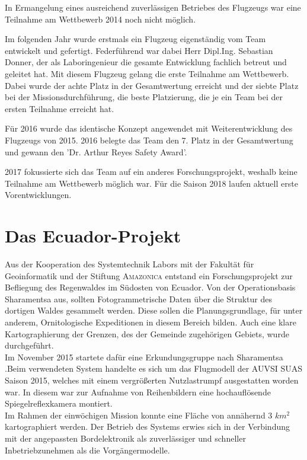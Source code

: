 In Ermangelung eines ausreichend zuverlässigen Betriebes des Flugzeugs war eine Teilnahme am Wettbewerb 2014 noch nicht möglich.

Im folgenden Jahr wurde erstmals ein Flugzeug eigenständig vom Team entwickelt und gefertigt. Federführend war dabei Herr Dipl.Ing. Sebastian Donner, der als Laboringenieur die gesamte Entwicklung fachlich betreut und geleitet hat. Mit diesem Flugzeug gelang die erste Teilnahme am Wettbewerb. Dabei wurde der achte Platz in der Gesamtwertung erreicht und der siebte Platz bei der Missionsdurchführung, die beste Platzierung, die je ein Team bei der ersten Teilnahme erreicht hat.   

Für 2016 wurde das identische Konzept angewendet mit Weiterentwicklung des Flugzeugs von 2015. 2016 belegte das Team den 7. Platz in der Gesamtwertung und gewann den 'Dr. Arthur Reyes Safety Award'.

2017 fokussierte sich das Team auf ein anderes Forschungsprojekt, weshalb keine Teilnahme am Wettbewerb möglich war. Für die Saison 2018 laufen aktuell erste Vorentwicklungen.

\section{Das Ecuador-Projekt}

Aus der Kooperation des Systemtechnik Labors mit der Fakultät für Geoinformatik und der Stiftung \textsc{Amazonica} entstand ein Forschungsprojekt zur Befliegung des Regenwaldes im Südosten von Ecuador. Von der Operationsbasis Sharamentsa aus, sollten Fotogrammetrische Daten über die Struktur des dortigen Waldes gesammelt werden. Diese sollen die Planungsgrundlage, für unter anderem, Ornitologische Expeditionen in diesem Bereich bilden. Auch eine klare Kartographierung der Grenzen, des der Gemeinde zugehörigen Gebiets, wurde durchgeführt.\\
Im November 2015 startete dafür eine Erkundungsgruppe nach Sharamentsa .Beim verwendeten System handelte es sich um das Flugmodell der AUVSI SUAS Saison 2015, welches mit einem vergrößerten Nutzlastrumpf ausgestatten worden war. In diesem war zur Aufnahme von Reihenbildern eine hochauflösende Spiegelreflexkamera montiert.\\
Im Rahmen der einwöchigen Mission konnte eine Fläche von annähernd 3 $km^2$ kartographiert werden. Der Betrieb des Systems erwies sich in der Verbindung mit der angepassten Bordelektronik als zuverlässiger und schneller Inbetriebzunehmen als die Vorgängermodelle.\cite{Niclas}

